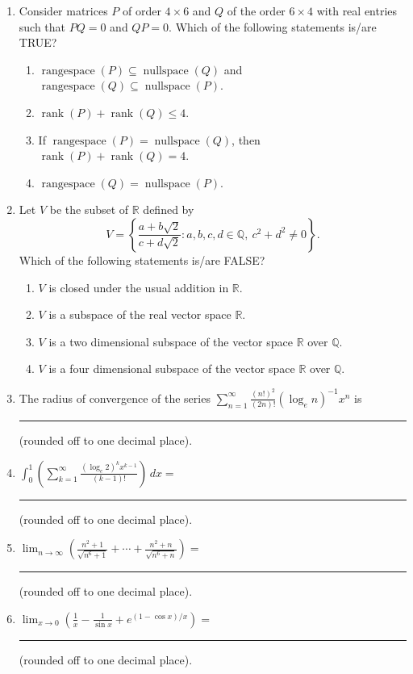 \begin{enumerate}
\begin{enumerate}[label=(\Alph*)]
\item $\displaystyle\sum_{k=0}^6(-1)^k\binom{13}{2k}=64$.
\item $\displaystyle\sum_{k=0}^6(-1)^k\binom{13}{2k+1}=-128$.
\end{enumerate}
\item Consider matrices $P$ of order $4\times6$ and $Q$ of the order $6\times4$ with real entries such that $PQ=0$ and $QP=0$. Which of the following statements is/are TRUE?
\begin{enumerate}[label=(\Alph*)]
\item $\operatorname{rangespace}(P)\subseteq\operatorname{nullspace}(Q)$ and $\operatorname{rangespace}(Q)\subseteq\operatorname{nullspace}(P)$.
\item $\operatorname{rank}(P)+\operatorname{rank}(Q)\le4$.
\item If $\operatorname{rangespace}(P)=\operatorname{nullspace}(Q)$, then $\operatorname{rank}(P)+\operatorname{rank}(Q)=4$.
\item $\operatorname{rangespace}(Q)=\operatorname{nullspace}(P)$.
\end{enumerate}
\item Let $V$ be the subset of $\mathbb R$ defined by
\[V=\left\{\frac{a+b\sqrt2}{c+d\sqrt2}:a,b,c,d\in\mathbb Q,\ c^2+d^2\ne0\right\}.\]
Which of the following statements is/are FALSE?
\begin{enumerate}[label=(\Alph*)]
\item $V$ is closed under the usual addition in $\mathbb R$.
\item $V$ is a subspace of the real vector space $\mathbb R$.
\item $V$ is a two dimensional subspace of the vector space $\mathbb R$ over $\mathbb Q$.
\item $V$ is a four dimensional subspace of the vector space $\mathbb R$ over $\mathbb Q$.
\end{enumerate}
\item The radius of convergence of the series $\displaystyle\sum_{n=1}^\infty\frac{(n!)^2}{(2n)!}(\log_e n)^{-1}x^n$ is \rule{2cm}{0.4pt} (rounded off to one decimal place).
\item $\displaystyle\int_0^1\left(\sum_{k=1}^\infty\frac{(\log_e2)^kx^{k-1}}{(k-1)!}\right)\,dx=$ \rule{2cm}{0.4pt} (rounded off to one decimal place).
\item $\displaystyle\lim_{n\to\infty}\left(\frac{n^2+1}{\sqrt{n^6+1}}+\cdots+\frac{n^2+n}{\sqrt{n^6+n}}\right)=$ \rule{2cm}{0.4pt} (rounded off to one decimal place).
\item $\displaystyle\lim_{x\to0}\left(\frac1x-\frac1{\sin x}+e^{(1-\cos x)/x}\right)=$ \rule{2cm}{0.4pt} (rounded off to one decimal place).

\end{enumerate}
